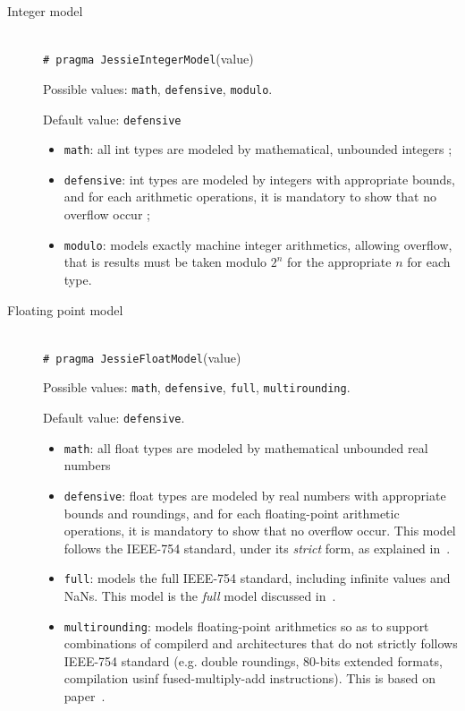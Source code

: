 \documentclass[a4paper,11pt,twoside,openright]{report}
\begin{document}
\begin{description}
\item[Integer model]~\\

  \texttt{\# pragma JessieIntegerModel}(value)

  Possible values: \texttt{math}, \texttt{defensive}, \texttt{modulo}.

  Default value: \texttt{defensive}
  \begin{itemize}
  \item \texttt{math}: all int types are modeled by mathematical,
    unbounded integers ;
  \item \texttt{defensive}: int types are modeled by integers with
    appropriate bounds, and for each arithmetic operations, it is
    mandatory to show that no overflow occur ;
  \item \texttt{modulo}: models exactly machine integer arithmetics,
    allowing overflow, that is results must be taken modulo $2^n$ for
    the appropriate $n$ for each type.
  \end{itemize}

\item[Floating point model] ~\\

  \texttt{\# pragma JessieFloatModel}(value)

  Possible values: \texttt{math}, \texttt{defensive}, \texttt{full},
  \texttt{multirounding}.

  Default value: \texttt{defensive}.

  \begin{itemize}
  \item \texttt{math}: all float types are modeled by
    mathematical unbounded real numbers
  \item \texttt{defensive}: float types are modeled by real numbers
    with appropriate bounds and roundings, and for each floating-point
    arithmetic operations, it is mandatory to show that no overflow
    occur. This model follows the IEEE-754 standard, under its
    \emph{strict} form, as explained in~\cite{ayad09,ayad10ijcar}.
  \item \texttt{full}: models the full IEEE-754 standard, including
    infinite values and NaNs. This model is the \emph{full} model
    discussed in~\cite{ayad09,ayad10ijcar}.
  \item \texttt{multirounding}: models floating-point arithmetics so
    as to support combinations of compilerd and architectures that do
    not strictly follows IEEE-754 standard (e.g. double roundings,
    80-bits extended formats, compilation usinf fused-multiply-add
    instructions). This is based on paper~\cite{boldo09misc,boldo10-nfm}.


\end{itemize}
\end{description}
\end{document}
